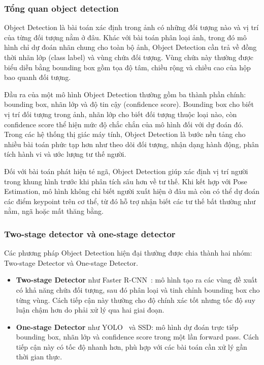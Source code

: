 \documentclass[12pt, a4paper]{article}
\begin{document}
\subsubsection{Tổng quan object detection}
Object Detection là bài toán xác định trong ảnh có những đối tượng nào và vị trí của từng đối tượng nằm ở đâu.
Khác với bài toán phân loại ảnh, trong đó mô hình chỉ dự đoán nhãn chung cho toàn bộ ảnh, Object Detection cần trả về đồng thời nhãn lớp (class label) và vùng chứa đối tượng.
Vùng chứa này thường được biểu diễn bằng bounding box gồm tọa độ tâm, chiều rộng và chiều cao của hộp bao quanh đối tượng.

Đầu ra của một mô hình Object Detection thường gồm ba thành phần chính: bounding box, nhãn lớp và độ tin cậy (confidence score).
Bounding box cho biết vị trí đối tượng trong ảnh, nhãn lớp cho biết đối tượng thuộc loại nào, còn confidence score thể hiện mức độ chắc chắn của mô hình đối với dự đoán đó.
Trong các hệ thống thị giác máy tính, Object Detection là bước nền tảng cho nhiều bài toán phức tạp hơn như theo dõi đối tượng, nhận dạng hành động, phân tích hành vi và ước lượng tư thế người.

Đối với bài toán phát hiện té ngã, Object Detection giúp xác định vị trí người trong khung hình trước khi phân tích sâu hơn về tư thế.
Khi kết hợp với Pose Estimation, mô hình không chỉ biết người xuất hiện ở đâu mà còn có thể dự đoán các điểm keypoint trên cơ thể, từ đó hỗ trợ nhận biết các tư thế bất thường như nằm, ngã hoặc mất thăng bằng.

\subsubsection{Two-stage detector và one-stage detector}
Các phương pháp Object Detection hiện đại thường được chia thành hai nhóm: Two-stage Detector và One-stage Detector.
\begin{itemize}
  \item \textbf{Two-stage Detector} như Faster R-CNN~\cite{ren2015faster}: mô hình tạo ra các vùng đề xuất có khả năng chứa đối tượng, sau đó phân loại và tinh chỉnh bounding box cho từng vùng. Cách tiếp cận này thường cho độ chính xác tốt nhưng tốc độ suy luận chậm hơn do phải xử lý qua hai giai đoạn.
  \item \textbf{One-stage Detector} như YOLO~\cite{redmon2016yolo} và SSD: mô hình dự đoán trực tiếp bounding box, nhãn lớp và confidence score trong một lần forward pass. Cách tiếp cận này có tốc độ nhanh hơn, phù hợp với các bài toán cần xử lý gần thời gian thực.
\end{itemize}
\end{document}
